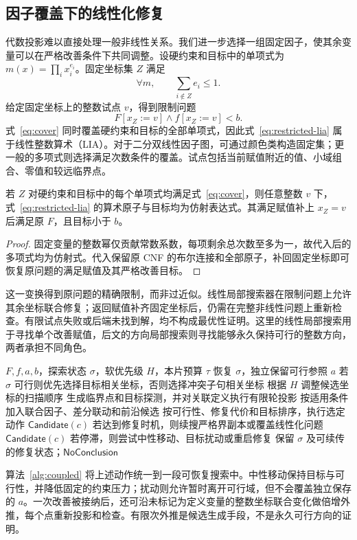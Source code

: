 \subsection{因子覆盖下的线性化修复}
代数投影难以直接处理一般非线性关系。我们进一步选择一组固定因子，使其余变量可以在严格改善条件下共同调整。设硬约束和目标中的单项式为 $m(x)=\prod_i x_i^{e_i}$。固定坐标集 $Z$ 满足
\begin{equation}
 \forall m,\qquad \sum_{i\notin Z}e_i\le1.
 \label{eq:cover}
\end{equation}
给定固定坐标上的整数试点 $v$，得到限制问题
\begin{equation}
 F[x_Z:=v]\land f[x_Z:=v]<b.
 \label{eq:restricted-lia}
\end{equation}
式~\eqref{eq:cover} 同时覆盖硬约束和目标的全部单项式，因此式~\eqref{eq:restricted-lia} 属于线性整数算术（LIA）。对于二分双线性因子图，可通过颜色类构造固定集；更一般的多项式则选择满足次数条件的覆盖。试点包括当前赋值附近的值、小域组合、零值和较远临界点。

\begin{proposition}[覆盖线性化]
\label{prop:cover}
若 $Z$ 对硬约束和目标中的每个单项式均满足式~\eqref{eq:cover}，则任意整数 $v$ 下，式~\eqref{eq:restricted-lia} 的算术原子与目标均为仿射表达式。其满足赋值补上 $x_Z=v$ 后满足原 $F$，且目标小于 $b$。
\end{proposition}
\begin{proof}
固定变量的整数幂仅贡献常数系数，每项剩余总次数至多为一，故代入后的多项式均为仿射式。代入保留原 CNF 的布尔连接和全部原子，补回固定坐标即可恢复原问题的满足赋值及其严格改善目标。
\end{proof}

这一变换得到原问题的精确限制，而非过近似。线性局部搜索器在限制问题上允许其余坐标联合修复；返回赋值补齐固定坐标后，仍需在完整非线性问题上重新检查。有限试点失败或后端未找到解，均不构成最优性证明。这里的线性局部搜索用于寻找单个改善赋值，后文的方向局部搜索则寻找能够永久保持可行的整数方向，两者承担不同角色。

\begin{algorithm}[htbp]
\caption{\textsc{CoupledImprove}：联合改善搜索的一段工作}
\label{alg:coupled}
\begin{algorithmic}[1]
\Require $F,f,a,b$，探索状态 $\sigma$，软优先级 $H$，本片预算 $\tau$
\State 恢复 $\sigma$，独立保留可行参照 $a$
 \State 若 $\sigma$ 可行则优先选择目标相关坐标，否则选择冲突子句相关坐标
 \State 根据 $H$ 调整候选坐标的扫描顺序
 \State 生成临界点和目标探测，并对关联定义执行有限轮投影
 \State 按适用条件加入联合因子、差分联动和前沿候选
 \State 按可行性、修复代价和目标排序，执行选定动作
  \State \Return $\mathsf{Candidate}(c)$ \EndIf
 \State 若达到修复时机，则续搜严格界副本或覆盖线性化问题
  \State \Return $\mathsf{Candidate}(c)$ \EndIf
 \State 若停滞，则尝试中性移动、目标扰动或重启修复
\EndWhile
\State 保留 $\sigma$ 及可续传的修复状态；\Return $\mathsf{NoConclusion}$
\end{algorithmic}
\end{algorithm}

算法~\ref{alg:coupled} 将上述动作统一到一段可恢复搜索中。中性移动保持目标与可行性，并降低固定的约束压力；扰动则允许暂时离开可行域，但不会覆盖独立保存的 $a$。一次改善被接纳后，还可沿未标记为定义变量的整数坐标联合变化做倍增外推，每个点重新投影和检查。有限次外推是候选生成手段，不是永久可行方向的证明。
